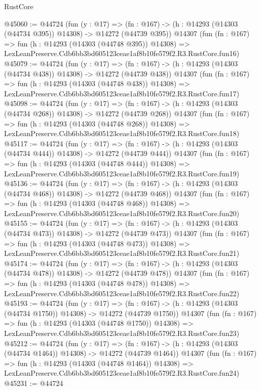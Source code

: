 \begin{lexlean}{RustCore}
\begin{coremodule}
@45060 := @44724
    (fun (y : @17) =>
    (fn : @167) -> (h : @14293 (@14303 (@44734 @395)) @14308) -> @14272 (@44739 @395))
    @14307
    (fun (fn : @167) =>
    fun (h : @14293 (@14303 (@44748 @395)) @14308) =>
    LexLeanPreserve.Cdb6bb3bd605123ceae1af8b10fe579f2.R3.RustCore.fun16)
@45079 := @44724
    (fun (y : @17) =>
    (fn : @167) -> (h : @14293 (@14303 (@44734 @438)) @14308) -> @14272 (@44739 @438))
    @14307
    (fun (fn : @167) =>
    fun (h : @14293 (@14303 (@44748 @438)) @14308) =>
    LexLeanPreserve.Cdb6bb3bd605123ceae1af8b10fe579f2.R3.RustCore.fun17)
@45098 := @44724
    (fun (y : @17) =>
    (fn : @167) -> (h : @14293 (@14303 (@44734 @268)) @14308) -> @14272 (@44739 @268))
    @14307
    (fun (fn : @167) =>
    fun (h : @14293 (@14303 (@44748 @268)) @14308) =>
    LexLeanPreserve.Cdb6bb3bd605123ceae1af8b10fe579f2.R3.RustCore.fun18)
@45117 := @44724
    (fun (y : @17) =>
    (fn : @167) -> (h : @14293 (@14303 (@44734 @444)) @14308) -> @14272 (@44739 @444))
    @14307
    (fun (fn : @167) =>
    fun (h : @14293 (@14303 (@44748 @444)) @14308) =>
    LexLeanPreserve.Cdb6bb3bd605123ceae1af8b10fe579f2.R3.RustCore.fun19)
@45136 := @44724
    (fun (y : @17) =>
    (fn : @167) -> (h : @14293 (@14303 (@44734 @468)) @14308) -> @14272 (@44739 @468))
    @14307
    (fun (fn : @167) =>
    fun (h : @14293 (@14303 (@44748 @468)) @14308) =>
    LexLeanPreserve.Cdb6bb3bd605123ceae1af8b10fe579f2.R3.RustCore.fun20)
@45155 := @44724
    (fun (y : @17) =>
    (fn : @167) -> (h : @14293 (@14303 (@44734 @473)) @14308) -> @14272 (@44739 @473))
    @14307
    (fun (fn : @167) =>
    fun (h : @14293 (@14303 (@44748 @473)) @14308) =>
    LexLeanPreserve.Cdb6bb3bd605123ceae1af8b10fe579f2.R3.RustCore.fun21)
@45174 := @44724
    (fun (y : @17) =>
    (fn : @167) -> (h : @14293 (@14303 (@44734 @478)) @14308) -> @14272 (@44739 @478))
    @14307
    (fun (fn : @167) =>
    fun (h : @14293 (@14303 (@44748 @478)) @14308) =>
    LexLeanPreserve.Cdb6bb3bd605123ceae1af8b10fe579f2.R3.RustCore.fun22)
@45193 := @44724
    (fun (y : @17) =>
    (fn : @167) -> (h : @14293 (@14303 (@44734 @1750)) @14308) -> @14272 (@44739 @1750))
    @14307
    (fun (fn : @167) =>
    fun (h : @14293 (@14303 (@44748 @1750)) @14308) =>
    LexLeanPreserve.Cdb6bb3bd605123ceae1af8b10fe579f2.R3.RustCore.fun23)
@45212 := @44724
    (fun (y : @17) =>
    (fn : @167) -> (h : @14293 (@14303 (@44734 @1464)) @14308) -> @14272 (@44739 @1464))
    @14307
    (fun (fn : @167) =>
    fun (h : @14293 (@14303 (@44748 @1464)) @14308) =>
    LexLeanPreserve.Cdb6bb3bd605123ceae1af8b10fe579f2.R3.RustCore.fun24)
@45231 := @44724

\end{coremodule}
\end{lexlean}
